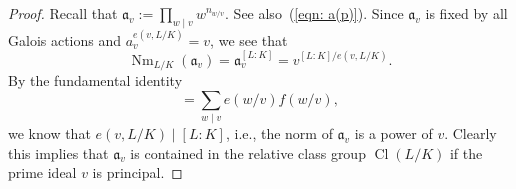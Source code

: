 \documentclass{amsart}
\numberwithin{equation}{section}
\theoremstyle{plain}
\theoremstyle{definition}
\theoremstyle{remark}
\begin{document}
\begin{proof}
	Recall that $\mathfrak{a}_v:=\prod_{w\mid v}w^{n_{w/v}}$.
        See also~(\ref{eqn: a(p)}).
	Since $\mathfrak{a}_v$ is fixed by all Galois actions and $a_v^{e(v,L/K)}=v$, we see that
	\begin{equation*}
		\operatorname{Nm}_{L/K}(\mathfrak{a}_v)=\mathfrak{a}_v^{[L:K]}=v^{[L:K]/e(v,L/K)}.
	\end{equation*}
	By the fundamental identity 
	\begin{equation*}
		[L:K]=\sum_{w\mid v}e(w/v)f(w/v),
	\end{equation*}
	we know that $e(v,L/K)\mid[L:K]$, i.e., the norm of $\mathfrak{a}_v$ is a power of $v$.
	Clearly this implies that $\mathfrak{a}_v$ is contained in the relative class group $\operatorname{Cl}(L/K)$ if the prime ideal $v$ is principal.
	

\end{proof}
\end{document}

